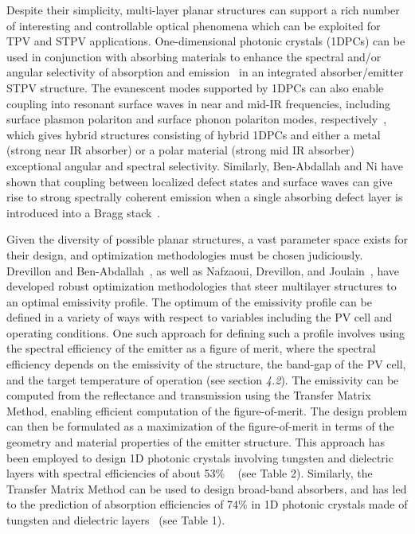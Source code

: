 \documentclass[10pt,letterpaper]{article}
\begin{document}
{Despite their simplicity, multi-layer planar structures can support a rich number of interesting and controllable optical phenomena
which can be exploited for TPV and STPV applications.  One-dimensional photonic crystals (1DPCs) can be used in conjunction with absorbing
materials to enhance the spectral and/or angular selectivity of absorption and emission~\cite{paper1_ref4} in an integrated absorber/emitter STPV
structure.  The evanescent modes supported by 1DPCs
can also enable coupling into resonant surface waves in near and mid-IR frequencies, including surface plasmon polariton and surface
phonon polariton modes, respectively~\cite{LZ_JApplPhys_2006}, which gives hybrid 
structures consisting of hybrid 1DPCs and either a metal (strong near IR
absorber) or a polar material (strong mid IR absorber) 
exceptional angular and spectral selectivity.  Similarly, Ben-Abdallah and Ni have shown that coupling
between localized defect states and surface waves can give rise to strong spectrally coherent emission when a single absorbing defect layer is
introduced into a Bragg stack~\cite{BN_JApplPhys_2005}.

Given the diversity of possible planar structures, a vast parameter space exists for their design, and optimization methodologies must
be chosen judiciously.  Drevillon and Ben-Abdallah~\cite{DB_JApplPhys_2007}, as well as Nafzaoui, Drevillon, and Joulain~\cite{NDJ_JApplPhys_2012},
have developed robust optimization 
methodologies that steer multilayer structures to an optimal emissivity profile. The optimum of the emissivity
profile can be defined in a variety of ways with respect to variables including the PV cell and operating conditions.
One such approach for defining such a profile involves using the spectral efficiency of the emitter as a figure of merit,
where the spectral efficiency depends on the emissivity of the structure, the band-gap of the PV cell, and the target 
temperature of operation (see section {\it 4.2}).  
The emissivity can be computed from the reflectance
and transmission using the Transfer Matrix Method, enabling efficient computation of the figure-of-merit.  The design problem can then be
formulated as a maximization of the figure-of-merit in terms of the geometry and material properties of the emitter structure.
This approach has been employed to design 1D photonic crystals involving tungsten and dielectric layers with spectral efficiencies of 
about 53\% ~\cite{real_efficient} (see Table 2).  Similarly, the Transfer 
Matrix Method can be used to design broad-band absorbers, 
and has led to the prediction of 
absorption efficiencies of 74\% in 1D photonic crystals made of tungsten 
and dielectric layers~\cite{real_efficient} (see Table 1).

}
\end{document}
